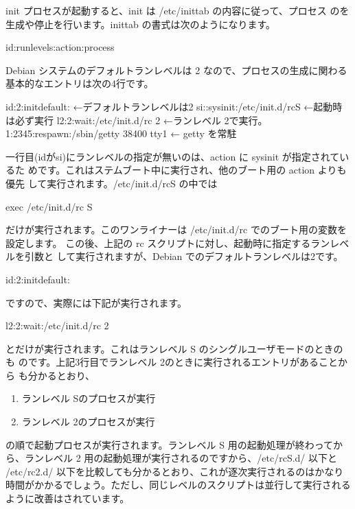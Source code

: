 \documentclass[mingoth,a4paper]{jsarticle}
\begin{document}
init プロセスが起動すると、init は /etc/inittab の内容に従って、プロセス
のを生成や停止を行います。inittab の書式は次のようになります。

\begin{commandline}
id:runlevels:action:process
\end{commandline}

Debian システムのデフォルトランレベルは 2 なので、プロセスの生成に関わる
基本的なエントリは次の4行です。

\begin{commandline}
id:2:initdefault:                     ←デフォルトランレベルは2
si::sysinit:/etc/init.d/rcS           ←起動時は必ず実行
l2:2:wait:/etc/init.d/rc 2            ←ランレベル 2で実行。
1:2345:respawn:/sbin/getty 38400 tty1 ← getty を常駐
\end{commandline}

一行目(idがsi)にランレベルの指定が無いのは、action に sysinit が指定されているた
めです。これはステムブート中に実行され、他のブート用の action よりも優先
して実行されます。/etc/init.d/rcS の中では

\begin{commandline}
exec /etc/init.d/rc S
\end{commandline}

だけが実行されます。このワンライナーは /etc/init.d/rc でのブート用の変数を設定します。
この後、上記の rc スクリプトに対し、起動時に指定するランレベルを引数と
して実行されますが、Debian でのデフォルトランレベルは2です。

\begin{commandline}
id:2:initdefault:
\end{commandline}

ですので、実際には下記が実行されます。

\begin{commandline}
l2:2:wait:/etc/init.d/rc 2
\end{commandline}

とだけが実行されます。これはランレベル S のシングルユーザモードのときのも
のです。上記3行目でランレベル 2のときに実行されるエントリがあることから
も分かるとおり、
\begin{enumerate}
 \item ランレベル Sのプロセスが実行
 \item ランレベル 2のプロセスが実行
\end{enumerate}
の順で起動プロセスが実行されます。ランレベル S 用の起動処理が終わってか
ら、ランレベル 2 用の起動処理が実行されるのですから、/etc/rcS.d/ 以下と
/etc/rc2.d/ 以下を比較しても分かるとおり、これが逐次実行されるのはかなり
時間がかかるでしょう。ただし、同じレベルのスクリプトは並行して実行される
ように改善はされています。
\end{document}
